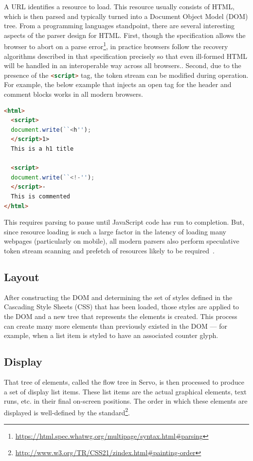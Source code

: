 A URL identifies a resource to load.
This resource usually consists of HTML, which is then parsed and typically turned into a Document Object
Model (DOM) tree.
From a programming languages standpoint, there are several interesting aspects of the parser design
for HTML.
First, though the specification allows the browser to abort on a parse error\footnote{\url{https://html.spec.whatwg.org/multipage/syntax.html#parsing}},
in practice browsers follow the recovery algorithms described in that specification precisely so that
even ill-formed HTML will be handled in an interoperable way across all browsers..
Second, due to the presence of the \lstinline[language=HTML]{<script>} tag, the token stream can be modified
during operation.
For example, the below example that injects an open tag for the header and comment blocks works in all modern browsers.
\begin{lstlisting}[language=HTML]
<html>
  <script>
  document.write(``<h'');
  </script>1>
  This is a h1 title

  <script>
  document.write(``<!-'');
  </script>-
  This is commented
</html>
\end{lstlisting}
This requires parsing to pause until JavaScript code has run to completion.
But, since resource loading is such a large factor in the latency of loading many webpages (particularly on mobile),
all modern parsers also perform speculative token stream scanning and prefetch of resources likely to be required~\cite{browsers-slow-smartphones}.

\subsection{Layout}

After constructing the DOM and determining the set of styles defined in the Cascading Style Sheets (CSS) that has
been loaded, those styles are applied to the DOM and a new tree that represents the elements is created.
This process can create many more elements than previously existed in the DOM --- for example, when a list item is
styled to have an associated counter glyph.

\subsection{Display}

That tree of elements, called the flow tree in Servo, is then processed to produce a set of display list items.
These list items are the actual graphical elements, text runs, etc. in their final on-screen positions.
The order in which these elements are displayed is well-defined by the standard\footnote{\url{http://www.w3.org/TR/CSS21/zindex.html#painting-order}}.


